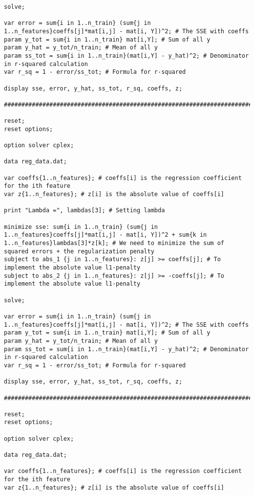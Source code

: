 \documentclass[15pt,a4paper,openright]{article}
\begin{document}
\begin{lstlisting}[language=AMPL, caption=1c Code]
solve;

var error = sum{i in 1..n_train} (sum{j in 1..n_features}coeffs[j]*mat[i,j] - mat[i, Y])^2; # The SSE with coeffs
param y_tot = sum{i in 1..n_train} mat[i,Y]; # Sum of all y
param y_hat = y_tot/n_train; # Mean of all y
param ss_tot = sum{i in 1..n_train}(mat[i,Y] - y_hat)^2; # Denominator in r-squared calculation
var r_sq = 1 - error/ss_tot; # Formula for r-squared

display sse, error, y_hat, ss_tot, r_sq, coeffs, z;

#############################################################################

reset;
reset options;

option solver cplex;

data reg_data.dat;

var coeffs{1..n_features}; # coeffs[i] is the regression coefficient for the ith feature
var z{1..n_features}; # z[i] is the absolute value of coeffs[i]

print "Lambda =", lambdas[3]; # Setting lambda

minimize sse: sum{i in 1..n_train} (sum{j in 1..n_features}coeffs[j]*mat[i,j] - mat[i, Y])^2 + sum{k in 1..n_features}lambdas[3]*z[k]; # We need to minimize the sum of squared errors + the regularization penalty
subject to abs_1 {j in 1..n_features}: z[j] >= coeffs[j]; # To implement the absolute value l1-penalty
subject to abs_2 {j in 1..n_features}: z[j] >= -coeffs[j]; # To implement the absolute value l1-penalty

solve;

var error = sum{i in 1..n_train} (sum{j in 1..n_features}coeffs[j]*mat[i,j] - mat[i, Y])^2; # The SSE with coeffs
param y_tot = sum{i in 1..n_train} mat[i,Y]; # Sum of all y
param y_hat = y_tot/n_train; # Mean of all y
param ss_tot = sum{i in 1..n_train}(mat[i,Y] - y_hat)^2; # Denominator in r-squared calculation
var r_sq = 1 - error/ss_tot; # Formula for r-squared

display sse, error, y_hat, ss_tot, r_sq, coeffs, z;

#############################################################################

reset;
reset options;

option solver cplex;

data reg_data.dat;

var coeffs{1..n_features}; # coeffs[i] is the regression coefficient for the ith feature
var z{1..n_features}; # z[i] is the absolute value of coeffs[i]


\end{lstlisting}
\end{document}
